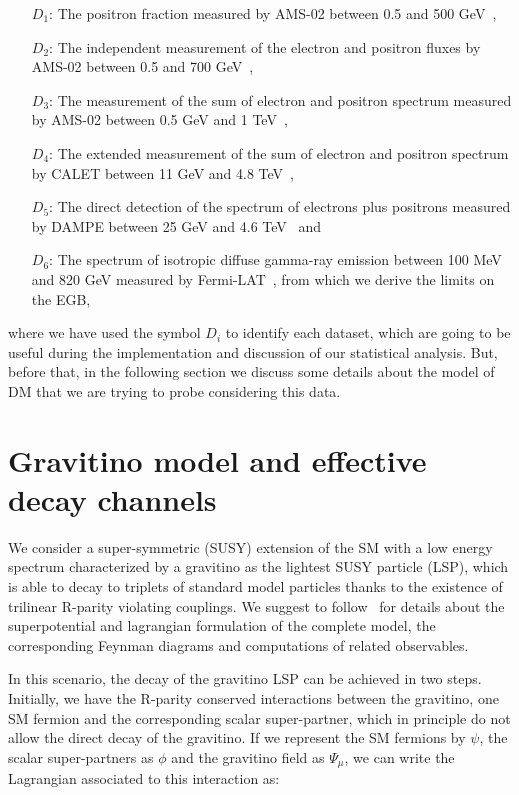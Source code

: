 \documentclass[a4paper,11pt]{article}
\begin{document}
\begin{itemize}
\item[$D_1$:] The positron fraction measured by AMS-02 between 0.5 and 500 GeV~\cite{Accardo:2014lma},
\item[$D_2$:] The independent measurement of the electron and positron fluxes by AMS-02 between 0.5 and 700 GeV~\cite{Aguilar:2014mma},
\item[$D_3$:] The measurement of the sum of electron and positron spectrum measured by AMS-02 between 0.5 GeV and 1 TeV~\cite{Aguilar:2014fea},
\item[$D_4$:] The extended measurement of the sum of electron and positron spectrum by CALET between 11 GeV and 4.8 TeV~\cite{Adriani:2018ktz},
\item[$D_5$:] The direct detection of the spectrum of electrons plus positrons measured by DAMPE between 25 GeV and 4.6 TeV~\cite{Ambrosi:2017wek} and
\item[$D_6$:] The spectrum of isotropic diffuse gamma-ray emission between 100 MeV and 820 GeV measured by Fermi-LAT~\cite{Ackermann:2014usa}, from which we derive the limits on the EGB,
\end{itemize}
 
\noindent where we have used the symbol $D_i$ to identify each dataset, which are going to be useful during the implementation and discussion of our statistical analysis. But, before that, in the following section we discuss some details about the model of DM that we are trying to probe considering this data.

 
\section{Gravitino model and effective decay channels}
\label{gdecay}

We consider a super-symmetric (SUSY) extension of the SM with a low energy spectrum characterized by a gravitino as the lightest SUSY particle (LSP), which is able to decay to triplets of standard model particles thanks to the existence of trilinear R-parity violating couplings. We suggest to follow~\cite{Grefe:2011dp, Moreau:2001sr} for details about the superpotential and lagrangian formulation of the complete model, the corresponding Feynman diagrams and computations of related observables. 

In this scenario, the decay of the gravitino LSP can be achieved in two steps. Initially, we have the R-parity conserved interactions between the gravitino, one SM fermion and the corresponding scalar super-partner, which in principle do not allow the direct decay of the gravitino. If we represent the SM fermions by $\psi$, the scalar super-partners as $\phi$ and the gravitino field as $\Psi_\mu$, we can write the Lagrangian associated to this interaction as:
\end{document}
